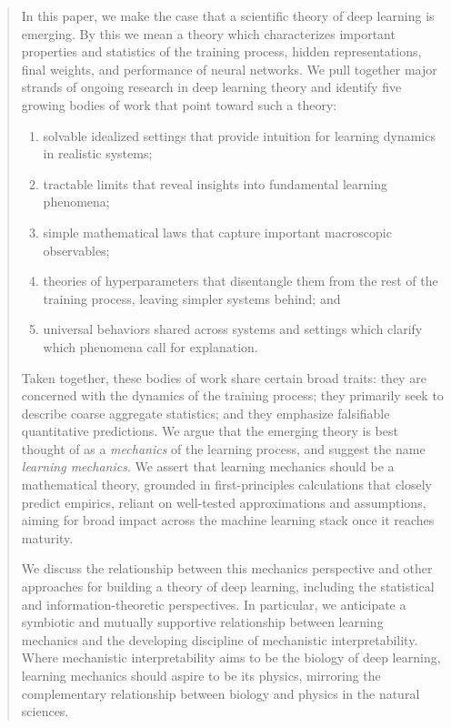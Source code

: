 \begin{abstract}

In this paper, we make the case that a scientific theory of deep learning is emerging.
By this we mean a theory which characterizes important properties and statistics of the training process, hidden representations, final weights, and performance of neural networks.
We pull together major strands of ongoing research in deep learning theory and identify five growing bodies of work that point toward such a theory:
\begin{enumerate}
    \item solvable idealized settings that provide intuition for learning dynamics in realistic systems;
    \item  tractable limits that reveal insights into fundamental learning phenomena;
    \item simple mathematical laws that capture important macroscopic observables;
    \item theories of hyperparameters that disentangle them from the rest of the training process, leaving simpler systems behind; and
    \item universal behaviors shared across systems and settings which clarify which phenomena call for explanation.
\end{enumerate}

Taken together, these bodies of work share certain broad traits: they are concerned with the dynamics of the training process; they primarily seek to describe coarse aggregate statistics; and they emphasize falsifiable quantitative predictions.
We argue that the emerging theory is best thought of as a \textit{mechanics} of the learning process, and suggest the name \textit{learning mechanics}.
We assert that learning mechanics should be a mathematical theory, grounded in first-principles calculations that closely predict empirics, reliant on well-tested approximations and assumptions, aiming for broad impact across the machine learning stack once it reaches maturity.

We discuss the relationship between this mechanics perspective and other approaches for building a theory of deep learning, including the statistical and information-theoretic perspectives.
In particular, we anticipate a symbiotic and mutually supportive relationship between learning mechanics and the developing discipline of mechanistic interpretability.
Where mechanistic interpretability aims to be the biology of deep learning, learning mechanics should aspire to be its physics, mirroring the complementary relationship between biology and physics in the natural sciences.


\end{abstract}
